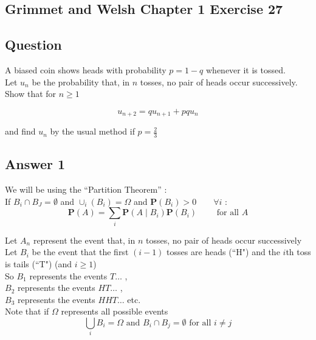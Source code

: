 \documentclass[a4paper,10pt]{article}
\begin{document}
\begin{flushleft}
\section{Grimmet and Welsh Chapter 1 Exercise 27}
\subsection{Question}

A biased coin shows heads with probability $p = 1 - q$ whenever it is tossed. \\
Let $u_n$ be the probability that, in $n$ tosses, no pair of heads occur successively. Show that for $n \geq 1$
 
\begin{equation*} 
u_{n+2} = q u_{n+1} + pq u_n 
\end{equation*}

and find $u_n$ by the usual method if $p = \frac{2}{3}$

\subsection{Answer 1}

We will be using the ``Partition Theorem'' : \\
If $B_i \cap B_J = \emptyset$ and $\cup_i (B_i) = \Omega$ and $\mathbf{P}(B_i) > 0 \qquad \forall i$ :
\begin{equation} 
\mathbf{P}(A) = \sum_i \mathbf{P}(A \mid B_i)\mathbf{P}(B_i) \qquad \text{ for all } A
   \tag{F1.9} \label{Formula1.9}
\end{equation}

Let $A_n$ represent the event that, in $n$ tosses, no pair of heads occur successively
Let $B_i$ be the event that the first $(i-1)$ tosses are heads (``H") and the $i$th toss is tails (``T") (and $i \geq 1$) \\
So $B_1$ represents the events $T\ldots$ ,\\
$B_2$ represents the events $HT\ldots$ ,\\
$B_3$ represents the events $HHT\ldots$  etc.\\

Note that if $\Omega$ represents all possible events
\begin{equation*} 
\bigcup_i B_i = \Omega    \text{ and }   B_i \cap B_j = \emptyset     \text{ for all } i \neq j
\end{equation*} \\


\end{flushleft}
\end{document}
